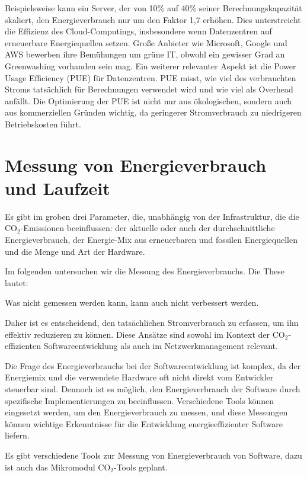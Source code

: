 \documentclass{article}
\newcommand{\comJP}[1]{
		~\\~
		\fcolorbox{red}{white}{\parbox{\linewidth}{ #1}}
		~\\~
}
\begin{document}
Beispielsweise kann ein Server, der von 10\% auf 40\% seiner Berechnungskapazität skaliert, den Energieverbrauch nur um den Faktor 1,7 erhöhen. Dies unterstreicht die Effizienz des Cloud-Computings, insbesondere wenn Datenzentren auf erneuerbare Energiequellen setzen. Große Anbieter wie Microsoft, Google und AWS bewerben ihre Bemühungen um grüne IT, obwohl ein gewisser Grad an Greenwashing vorhanden sein mag. 
Ein weiterer relevanter Aspekt ist die Power Usage Efficiency (PUE) für Datenzentren. PUE misst, wie viel des verbrauchten Stroms tatsächlich für Berechnungen verwendet wird und wie viel als Overhead anfällt. Die Optimierung der PUE ist nicht nur aus ökologischen, sondern auch aus kommerziellen Gründen wichtig, da geringerer Stromverbrauch zu niedrigeren Betriebskosten führt.


\section{Messung von Energieverbrauch und Laufzeit}

Es gibt im groben drei Parameter, die, unabhängig von der Infrastruktur, die die CO$_2$-Emissionen beeinflussen:
der aktuelle oder auch der durchschnittliche  Energieverbrauch, der  Energie-Mix aus erneuerbaren und fossilen Energiequellen und die Menge und Art der Hardware.

Im folgenden untersuchen wir die Messung des Energieverbrauchs. Die These lautet: 
\begin{center}
Was nicht gemessen werden kann, kann auch nicht verbessert werden. 
\end{center}
Daher ist es entscheidend, den tatsächlichen Stromverbrauch zu erfassen, um ihn effektiv reduzieren zu können. Diese Ansätze sind sowohl im Kontext der CO$_2$-effizienten Softwareentwicklung als auch im Netzwerkmanagement relevant.

Die Frage des Energieverbrauchs bei der Softwareentwicklung ist komplex, da der Energiemix und die verwendete Hardware oft nicht direkt vom Entwickler steuerbar sind. Dennoch ist es möglich, den Energieverbrauch der Software durch spezifische Implementierungen zu beeinflussen. Verschiedene Tools können eingesetzt werden, um den Energieverbrauch zu messen, und diese Messungen können wichtige Erkenntnisse für die Entwicklung energieeffizienter Software liefern.

Es gibt verschiedene Tools zur Messung von Energieverbrauch von Software, dazu ist auch das 
Mikromodul \glqq CO$_2$-Tools\grqq{} geplant.
\comJP{hier fehlen noch Quellen\cite{????}\\~}
%
\end{document}
